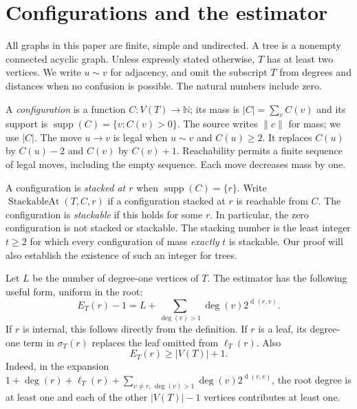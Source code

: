 \documentclass[11pt]{amsart}
\theoremstyle{definition}
\theoremstyle{remark}
\DeclareMathOperator{\dist}{d}
\DeclareMathOperator{\supp}{supp}
\newcommand{\mass}[1]{\lvert #1\rvert}
\newcommand{\NN}{\mathbb N}
\newcommand{\StackableAt}{\operatorname{StackableAt}}
\begin{document}
\section{Configurations and the estimator}
All graphs in this paper are finite, simple and undirected. A tree is a
nonempty connected acyclic graph. Unless expressly stated otherwise,
$T$ has at least two vertices. We write $u\sim v$ for adjacency, and omit
the subscript $T$ from degrees and distances when no confusion is possible.
The natural numbers include zero.

A \emph{configuration} is a function $C:V(T)\to\NN$; its mass is
$\mass{C}=\sum_vC(v)$ and its support is $\supp(C)=\{v:C(v)>0\}$.
The source writes $\|c\|$ for mass; we use $\mass{C}$.
The move $u\to v$ is legal when $u\sim v$ and $C(u)\ge2$.
It replaces $C(u)$ by $C(u)-2$ and $C(v)$ by $C(v)+1$.
Reachability permits a finite sequence of legal moves, including the empty
sequence. Each move decreases mass by one.

A configuration is \emph{stacked at $r$} when
$\supp(C)=\{r\}$. Write $\StackableAt(T,C,r)$ if a configuration stacked
at $r$ is reachable from $C$. The configuration is \emph{stackable} if this
holds for some $r$.
In particular, the zero configuration is not stacked or stackable.
The stacking number is the least integer $t\ge2$ for which every
configuration of mass \emph{exactly} $t$ is stackable. Our proof will also
establish the existence of such an integer for trees.

Let $L$ be the number of degree-one vertices of $T$. The estimator has the
following useful form, uniform in the root:
\begin{equation}\label{eq:compact-estimator}
 E_T(r)-1=L+\sum_{\deg(v)>1}\deg(v)2^{\dist(r,v)}.
\end{equation}
If $r$ is internal, this follows directly from the definition. If $r$ is
a leaf, its degree-one term in $\sigma_T(r)$ replaces the leaf omitted from
$\ell_T(r)$. Also
\begin{equation}\label{eq:estim-large}
 E_T(r)\ge |V(T)|+1.
\end{equation}
Indeed, in the expansion
$1+\deg(r)+\ell_T(r)+\sum_{v\ne r,\,\deg(v)>1}\deg(v)2^{\dist(r,v)}$,
the root degree is at least one and each of the other $|V(T)|-1$ vertices
contributes at least one.




\end{document}
